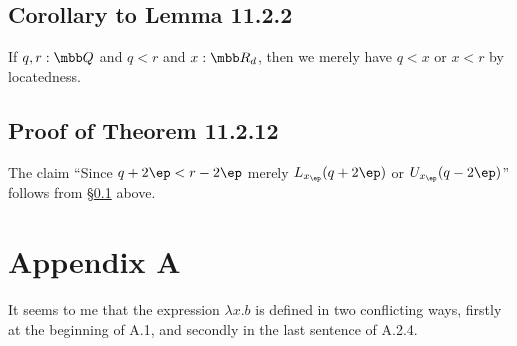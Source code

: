 \documentclass[12pt]{article}
\begin{document}


\subsection{Corollary to Lemma 11.2.2}\label{1122}

If $q,r:\mbb Q$ and $q<r$ and $x:\mbb R_d$, then we merely have $q<x$ or $x<r$ by locatedness.

\subsection{Proof of Theorem 11.2.12}

The claim ``Since $q+2\ep<r-2\ep$ merely $L_{x_\ep}(q+2\ep)$ or $U_{x_\ep}(q-2\ep)$'' follows from \S\ref{1122} above.


\section{Appendix A}

It seems to me that the expression $\lambda x.b$ is defined in two conflicting ways, firstly at the beginning of A.1, and secondly in the last sentence of A.2.4. 
\end{document}
